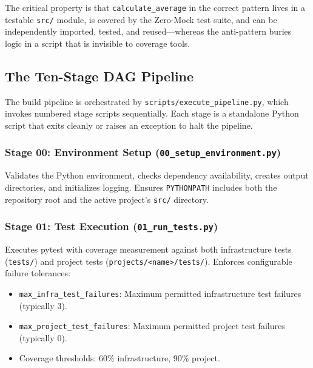 \documentclass[
]{article}
\providecommand{\tightlist}{%
  \setlength{\itemsep}{0pt}\setlength{\parskip}{0pt}}
\begin{document}
The critical property is that \texttt{calculate\_average} in the correct
pattern lives in a testable \texttt{src/} module, is covered by the
Zero-Mock test suite, and can be independently imported, tested, and
reused---whereas the anti-pattern buries logic in a script that is
invisible to coverage tools.

\newpage

\subsection{The Ten-Stage DAG
Pipeline}\label{the-ten-stage-dag-pipeline}

The build pipeline is orchestrated by
\texttt{scripts/execute\_pipeline.py}, which invokes numbered stage
scripts sequentially. Each stage is a standalone Python script that
exits cleanly or raises an exception to halt the pipeline.

\subsubsection{\texorpdfstring{Stage 00: Environment Setup
(\texttt{00\_setup\_environment.py})}{Stage 00: Environment Setup (00\_setup\_environment.py)}}\label{stage-00-environment-setup-00_setup_environment.py}

Validates the Python environment, checks dependency availability,
creates output directories, and initializes logging. Ensures
\texttt{PYTHONPATH} includes both the repository root and the active
project's \texttt{src/} directory.

\subsubsection{\texorpdfstring{Stage 01: Test Execution
(\texttt{01\_run\_tests.py})}{Stage 01: Test Execution (01\_run\_tests.py)}}\label{stage-01-test-execution-01_run_tests.py}

Executes pytest with coverage measurement against both infrastructure
tests (\texttt{tests/}) and project tests
(\texttt{projects/\textless{}name\textgreater{}/tests/}). Enforces
configurable failure tolerances:

\begin{itemize}
\tightlist
\item
  \texttt{max\_infra\_test\_failures}: Maximum permitted infrastructure
  test failures (typically 3).
\item
  \texttt{max\_project\_test\_failures}: Maximum permitted project test
  failures (typically 0).
\item
  Coverage thresholds: 60\% infrastructure, 90\% project.
\end{itemize}
\end{document}
